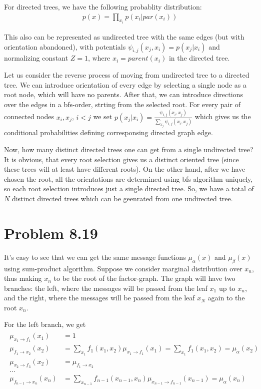 \documentclass[fleqn]{article}
\begin{document}
For directed trees, we have the following probablity distribution:
\begin{align}
	p(x) = \prod\limits_{x_i} p(x_i | par(x_i))
\end{align}

This also can be represented as undirected tree with the same edges (but with orientation abandoned), with potentials $\psi_{i,j}(x_j, x_i) = p(x_j | x_i)$ and normalizing constant $Z = 1$, where $x_i = parent(x_i)$ in the directed tree.

Let us consider the reverse process of moving from undirected tree to a directed tree. We can introduce orientation of every edge by selecting a single node as a root node, which will have no parents. After that, we can introduce directions over the edges in a bfs-order, strting from the selected root. For every pair of connected nodes $x_i, x_j$, $i < j$ we set $p(x_j | x_i) = \frac{\psi_{i,j}(x_i, x_j)}{\sum\limits_{x_j}\psi_{i,j}(x_i, x_j)}$
which gives us the conditional probabilities defining corresponsing directed graph edge.


Now, how many distinct directed trees one can get from a single undirected tree? It is obvious, that every root selection gives us a distinct oriented tree (since these trees will at least have different roots). On the other hand, after we have chosen the root, all the orientations are determined using bfs algorithm uniquely, so each root selection introduces just a single directed tree. So, we have a total of $N$ distinct directed trees which can be geenrated from one undirected tree.


\section*{Problem 8.19}

It's easy to see that we can get the same message functions $\mu_\alpha(x)$ and $\mu_\beta(x)$ using sum-product algorithm. Suppose we consider marginal distribution over $x_n$, thus making $x_n$ to be the root of the factor-graph. The graph will have two branches: the left, where the messages will be passed from the leaf $x_1$ up to $x_n$, and the right, where the messages will be passed from the leaf $x_N$ again to the root $x_n$.

For the left branch, we get
\begin{align}
\begin{split}
\mu_{x_1\to f_1} (x_1)&= 1 \\
\mu_{f_1\to x_2} (x_2)&= \sum\limits_{x_1}f_1(x_1, x_2)\mu_{x_1\to f_1}(x_1) = \sum\limits_{x_1}f_1(x_1, x_2) = \mu_\alpha(x_2)\\
\mu_{x_2\to f_3}(x_2) &= \mu_{f_1\to x_2}\\
\ldots\\
\mu_{f_{n-1}\to x_n}(x_n) &= \sum\limits_{x_{n-1}}f_{n-1}(x_{n-1}, x_{n})\mu_{x_{n-1}\to f_{n-1}}(x_{n-1}) = \mu_\alpha(x_n)
\end{split}
\end{align}
\end{document}
